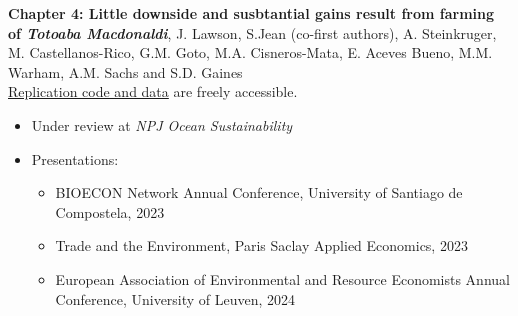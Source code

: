 %
\textbf{Chapter 4: Little downside and susbtantial gains result from farming of \textit{Totoaba Macdonaldi}}, J. Lawson, S.Jean (co-first authors), A. Steinkruger, M. Castellanos-Rico, G.M. Goto, M.A. Cisneros-Mata, E. Aceves Bueno, M.M. Warham, A.M. Sachs and S.D. Gaines\\
\href{https://github.com/julawson/conservation_farming_totoaba}{Replication code and data} are freely accessible.
%
\begin{itemize}
\item Under review at \textit{NPJ Ocean Sustainability}
\item Presentations:
\begin{itemize}
\item BIOECON Network Annual Conference, University of Santiago de Compostela, 2023
\item Trade and the Environment, Paris Saclay Applied Economics, 2023
\item European Association of Environmental and Resource Economists Annual Conference, University of Leuven, 2024
\end{itemize}
\end{itemize}
%
